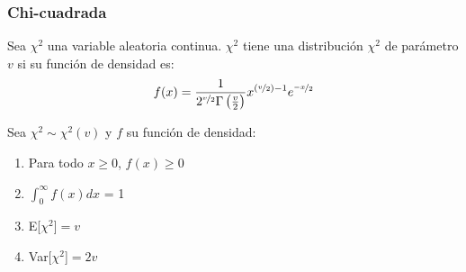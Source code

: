\subsubsection{Chi-cuadrada}
\begin{Def}
    Sea $\chi^2$ una variable aleatoria continua. $\chi^2$ tiene una
    distribución $\chi^2$ de parámetro $v$ si su función de densidad es:
    \[
        f(x) = \frac{1}{2^{\nicefrac{v}{2}}\Gamma\left(\frac{v}{2}\right)}
        x^{\left(\nicefrac{v}{2}\right)-1}e^{\nicefrac{-x}{2}}
    \] 
\end{Def}

\begin{Teo}
    Sea $\chi^2 \sim \chi^2(v)$ y $f$ su función de densidad:
    \begin{enumerate}
        \item Para todo $x \geq 0$, $f(x) \geq 0$
        \item $\int_{0}^{\infty}f(x)dx$ = 1
        \item E[$\chi^2$]$= v$
        \item Var[$\chi^2$]$= 2v$
    \end{enumerate}
\end{Teo}

